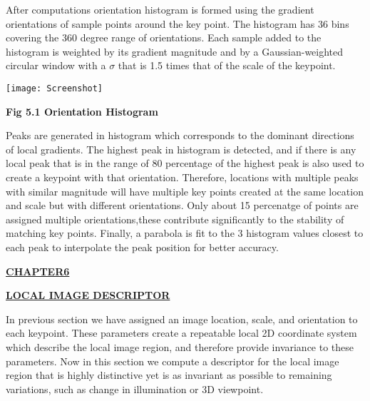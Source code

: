 \documentclass[12pt,a4paper]{report}
\begin{document}
\begin{flushleft}
After computations orientation histogram is formed using the gradient orientations of sample points around the key point. The  histogram has 36 bins covering the 360 degree range of orientations. Each sample added to the histogram is weighted by its gradient magnitude and by a Gaussian-weighted circular window with a $\sigma$ that is 1.5 times that of the scale of the keypoint.\par

\vspace{10mm}




\begin{center}\texttt{[image: Screenshot]}\end{center}
\begin{center}\textbf{Fig 5.1 Orientation Histogram}\end{center}







Peaks are generated in histogram which corresponds  to the  dominant directions of local gradients.
The highest peak in histogram  is detected, and if there is any local peak that is in the range of 
80 percentage of the highest peak is  also  used to create a keypoint with that orientation. Therefore,
locations with multiple peaks with similar magnitude will have multiple  key points created at
the same location and scale but with different orientations. Only about 15 percenatge of points are assigned
multiple orientations,these contribute significantly to the stability of matching key points. Finally, a
parabola is fit to the 3 histogram values closest to each peak to interpolate the peak position
for better accuracy.


\newpage

\begin{center}\underline{ \Large \textbf{CHAPTER6}}\end{center}
\begin{center}\underline{ \Large \textbf{LOCAL IMAGE DESCRIPTOR}}\end{center}

\vspace{10mm}





In previous section we have assigned an image location, scale, and orientation to each keypoint. These parameters create a repeatable local 2D coordinate system which  describe the local image region, and therefore provide invariance to these parameters. Now in this section we compute a descriptor for the local image region that is highly distinctive yet is as invariant as possible to remaining variations, such as change in illumination or 3D viewpoint.\par


\end{flushleft}
\end{document}
